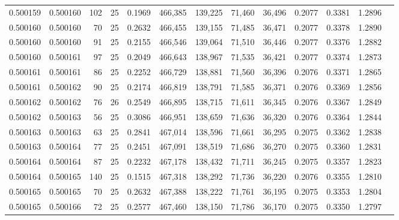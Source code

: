 \begin{tabular}{rrrrrrrrrrrrr}
0.500159 & 0.500160 & 102 &  25 &                                     0.1969 & 466,385 & 139,225 &  71,460 &  36,496 & 0.2077 & 0.3381 & 1.2896 \\
0.500160 & 0.500160 &  70 &  25 &                                     0.2632 & 466,455 & 139,155 &  71,485 &  36,471 & 0.2077 & 0.3378 & 1.2890 \\
0.500160 & 0.500160 &  91 &  25 &                                     0.2155 & 466,546 & 139,064 &  71,510 &  36,446 & 0.2077 & 0.3376 & 1.2882 \\
0.500160 & 0.500161 &  97 &  25 &                                     0.2049 & 466,643 & 138,967 &  71,535 &  36,421 & 0.2077 & 0.3374 & 1.2873 \\
0.500161 & 0.500161 &  86 &  25 &                                     0.2252 & 466,729 & 138,881 &  71,560 &  36,396 & 0.2076 & 0.3371 & 1.2865 \\
0.500161 & 0.500162 &  90 &  25 &                                     0.2174 & 466,819 & 138,791 &  71,585 &  36,371 & 0.2076 & 0.3369 & 1.2856 \\
0.500162 & 0.500162 &  76 &  26 &                                     0.2549 & 466,895 & 138,715 &  71,611 &  36,345 & 0.2076 & 0.3367 & 1.2849 \\
0.500162 & 0.500163 &  56 &  25 &                                     0.3086 & 466,951 & 138,659 &  71,636 &  36,320 & 0.2076 & 0.3364 & 1.2844 \\
0.500163 & 0.500163 &  63 &  25 &                                     0.2841 & 467,014 & 138,596 &  71,661 &  36,295 & 0.2075 & 0.3362 & 1.2838 \\
0.500163 & 0.500164 &  77 &  25 &                                     0.2451 & 467,091 & 138,519 &  71,686 &  36,270 & 0.2075 & 0.3360 & 1.2831 \\
0.500164 & 0.500164 &  87 &  25 &                                     0.2232 & 467,178 & 138,432 &  71,711 &  36,245 & 0.2075 & 0.3357 & 1.2823 \\
0.500164 & 0.500165 & 140 &  25 &                                     0.1515 & 467,318 & 138,292 &  71,736 &  36,220 & 0.2076 & 0.3355 & 1.2810 \\
0.500165 & 0.500165 &  70 &  25 &                                     0.2632 & 467,388 & 138,222 &  71,761 &  36,195 & 0.2075 & 0.3353 & 1.2804 \\
0.500165 & 0.500166 &  72 &  25 &                                     0.2577 & 467,460 & 138,150 &  71,786 &  36,170 & 0.2075 & 0.3350 & 1.2797 \\

\end{tabular}
